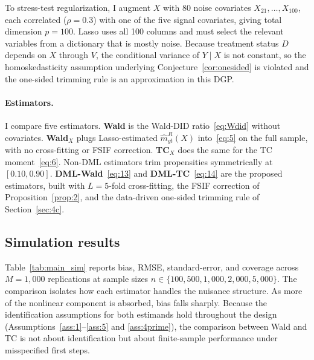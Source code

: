 To stress-test regularization, I augment $X$ with 80 noise covariates $X_{21}, \ldots, X_{100}$, each correlated ($\rho = 0.3$) with one of the five signal covariates, giving total dimension $p = 100$. Lasso uses all 100 columns and must select the relevant variables from a dictionary that is mostly noise. Because treatment status $D$ depends on $X$ through $V$, the conditional variance of $Y \mid X$ is not constant, so the homoskedasticity assumption underlying Conjecture~\ref{cor:onesided} is violated and the one-sided trimming rule is an approximation in this DGP.

\paragraph{Estimators.} I compare five estimators. \textbf{Wald} is the Wald-DID ratio~\eqref{eq:Wdid} without covariates. \textbf{Wald$_X$} plugs Lasso-estimated $\hat m^R_{gt}(X)$ into~\eqref{eq:5} on the full sample, with no cross-fitting or FSIF correction. \textbf{TC$_X$} does the same for the TC moment~\eqref{eq:6}. Non-DML estimators trim propensities symmetrically at $[0.10, 0.90]$. \textbf{DML-Wald}~\eqref{eq:13} and \textbf{DML-TC}~\eqref{eq:14} are the proposed estimators, built with $L=5$-fold cross-fitting, the FSIF correction of Proposition~\ref{prop:2}, and the data-driven one-sided trimming rule of Section~\ref{sec:4c}.

\subsection{Simulation results}\label{sec:5c}

Table~\ref{tab:main_sim} reports bias, RMSE, standard-error, and coverage across $M=1{,}000$ replications at sample sizes $n \in \{100, 500, 1{,}000, 2{,}000, 5{,}000\}$. The comparison isolates how each estimator handles the nuisance structure. As more of the nonlinear component is absorbed, bias falls sharply. Because the identification assumptions for both estimands hold throughout the design (Assumptions~\ref{ass:1}--\ref{ass:5} and \ref{ass:4prime}), the comparison between Wald and TC is not about identification but about finite-sample performance under misspecified first steps.

